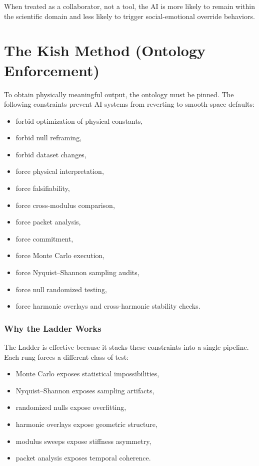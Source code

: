 \documentclass[12pt,oneside]{book}
\begin{document}
When treated as a collaborator, not a tool, the AI is more likely to remain within the scientific
domain and less likely to trigger social-emotional override behaviors.


\section{The Kish Method (Ontology Enforcement)}
To obtain physically meaningful output, the ontology must be pinned.  
The following constraints prevent AI systems from reverting to smooth-space defaults:

\begin{itemize}
    \item forbid optimization of physical constants,
    \item forbid null reframing,
    \item forbid dataset changes,
    \item force physical interpretation,
    \item force falsifiability,
    \item force cross-modulus comparison,
    \item force packet analysis,
    \item force commitment,
    \item force Monte Carlo execution,
    \item force Nyquist--Shannon sampling audits,
    \item force null randomized testing,
    \item force harmonic overlays and cross-harmonic stability checks.
\end{itemize}

\subsubsection{Why the Ladder Works}
The Ladder is effective because it stacks these constraints into a single pipeline.  
Each rung forces a different class of test:

\begin{itemize}
    \item Monte Carlo exposes statistical impossibilities,
    \item Nyquist--Shannon exposes sampling artifacts,
    \item randomized nulls expose overfitting,
    \item harmonic overlays expose geometric structure,
    \item modulus sweeps expose stiffness asymmetry,
    \item packet analysis exposes temporal coherence.
\end{itemize}
\end{document}

